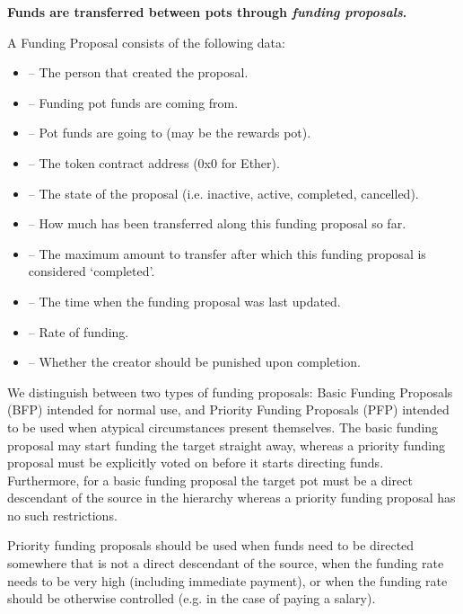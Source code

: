 \textbf{Funds are transferred between pots through \emph{funding proposals}.}
\begin{description}
 \item A Funding Proposal consists of the following data:
 \begin{itemize}
  \item {}	--	The person that created the proposal.
  \item {}	--	Funding pot funds are coming from.
  \item {}	--	Pot funds are going to (may be the rewards pot).
  \item {}	--	The token contract address (0x0 for Ether).
  \item {}	--	The state of the proposal (i.e. inactive, active, completed, cancelled).
  \item {}	--	How much has been transferred along this funding proposal so far.
  \item {}	--	The maximum amount to transfer after which this funding proposal is considered `completed'.
  \item {}	--	The time when the funding proposal was last updated.
  \item {}	--	Rate of funding.
  \item {} -- Whether the creator should be punished upon completion.
 \end{itemize}

\end{description}
We distinguish between two types of funding proposals: Basic Funding Proposals (BFP) intended for normal use, and Priority Funding Proposals (PFP) intended to be used when atypical circumstances present themselves. The basic funding proposal may start funding the target straight away, whereas a priority funding proposal must be explicitly voted on before it starts directing funds. Furthermore, for a basic funding proposal the target pot must be a direct descendant of the source in the hierarchy whereas a priority funding proposal has no such restrictions.

Priority funding proposals should be used when funds need to be directed somewhere that is not a direct descendant of the source, when the funding rate needs to be very high (including immediate payment), or when the funding rate should be otherwise controlled (e.g. in the case of paying a salary).

